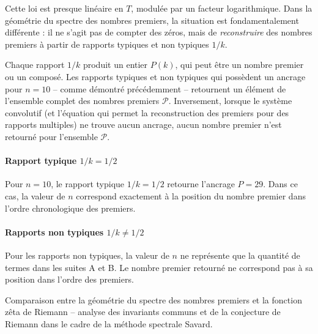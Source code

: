 Cette loi est presque linéaire en $T$, modulée par un facteur logarithmique. Dans la géométrie du spectre des nombres premiers, la situation est fondamentalement différente : il ne s'agit pas de compter des zéros, mais de \emph{reconstruire} des nombres premiers à partir de rapports typiques et non typiques $1/k$.

Chaque rapport $1/k$ produit un entier $P(k)$, qui peut être un nombre premier ou un composé. Les rapports typiques et non typiques qui possèdent un ancrage pour $n=10$ -- comme démontré précédemment -- retournent un élément de l'ensemble complet des nombres premiers $\mathcal{P}$. Inversement, lorsque le système convolutif (et l'équation qui permet la reconstruction des premiers pour des rapports multiples) ne trouve aucun ancrage, aucun nombre premier n'est retourné pour l'ensemble $\mathcal{P}$.

\paragraph{Rapport typique $1/k = 1/2$}

Pour $n=10$, le rapport typique $1/k = 1/2$ retourne l'ancrage $P = 29$. Dans ce cas, la valeur de $n$ correspond exactement à la position du nombre premier dans l'ordre chronologique des premiers.

\paragraph{Rapports non typiques $1/k \neq 1/2$}

Pour les rapports non typiques, la valeur de $n$ ne représente que la quantité de termes dans les suites A et B. Le nombre premier retourné ne correspond pas à sa position dans l'ordre des premiers.

\vspace{0.5cm}

Comparaison entre la géométrie du spectre des nombres premiers et la fonction zêta de Riemann -- analyse des invariants communs et de la conjecture de Riemann dans le cadre de la méthode spectrale Savard.